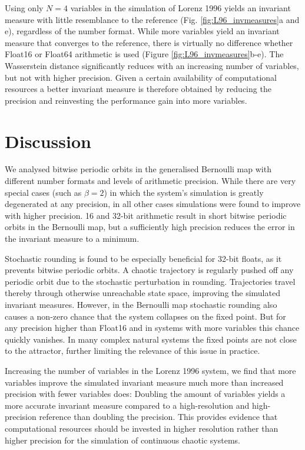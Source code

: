 Using only $N=4$ variables in the simulation of Lorenz 1996 yields an invariant measure with little resemblance to the reference (Fig.
\ref{fig:L96_invmeasures}a and e), regardless of the number format. While more variables yield an invariant measure that converges
to the reference, there is virtually no difference whether Float16 or Float64 arithmetic is used (Figure \ref{fig:L96_invmeasures}b-e).
The Wasserstein distance significantly reduces with an increasing number of variables, but not with higher precision. Given a certain
availability of computational resources a better invariant measure is therefore obtained by reducing the precision and reinvesting the
performance gain into more variables.

\section{Discussion}
\label{sec:orbits_discussion}

We analysed bitwise periodic orbits in the generalised Bernoulli map with different number formats and levels of arithmetic precision. 
While there are very special cases (such as $\beta = 2$) in which the system’s simulation is greatly degenerated at any precision,
in all other cases simulations were found to improve with higher precision. 16 and 32-bit arithmetic result in short bitwise periodic
orbits in the Bernoulli map, but a sufficiently high precision reduces the error in the invariant measure to a minimum. 

Stochastic rounding is found to be especially beneficial for 32-bit floats, as it prevents bitwise periodic orbits. A chaotic trajectory is
regularly pushed off any periodic orbit due to the stochastic perturbation in rounding. Trajectories travel thereby through otherwise
unreachable state space, improving the simulated invariant measures. However, in the Bernoulli map stochastic rounding also
causes a non-zero chance that the system collapses on the fixed point. But for any precision higher than Float16 and in systems
with more variables this chance quickly vanishes. In many complex natural systems the fixed points are not close to the attractor,
further limiting the relevance of this issue in practice.

Increasing the number of variables in the Lorenz 1996 system, we find that more variables improve the simulated invariant measure
much more than increased precision with fewer variables does: Doubling the amount of variables yields a more accurate invariant
measure compared to a high-resolution and high-precision reference than doubling the precision. This provides evidence that
computational resources should be invested in higher resolution rather than higher precision for the simulation of continuous
chaotic systems.

